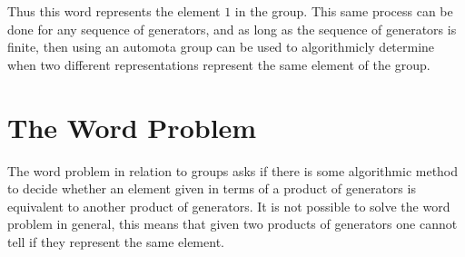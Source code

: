 \documentclass[10pt]{amsart}
\theoremstyle{definition}
\begin{document}
Thus this word represents the element $1$ in the group. This same process can
be done for any sequence of generators, and as long as the sequence of
generators is finite, then using an automota group can be used to algorithmicly
determine when two different representations represent the same element of the
group.

\section{The Word Problem}%
\label{sec:the_word_problem}

The word problem in relation to groups asks if there is some algorithmic method
to decide whether an element given in terms of a product of generators is
equivalent to another product of generators. It is not possible to solve the
word problem in general, this means that given two products of generators one
cannot tell if they represent the same element.
\end{document}
